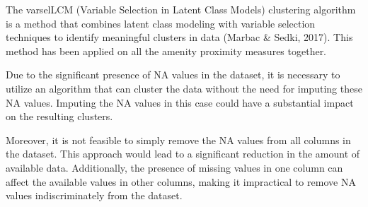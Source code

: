 \documentclass[11pt, a4paper]{article}
\begin{document}
The varselLCM (Variable Selection in Latent Class Models) clustering algorithm is a method that combines latent class modeling with variable selection techniques to identify meaningful clusters in data (Marbac \& Sedki, 2017). This method has been applied on all the amenity proximity measures together.
\par
Due to the significant presence of NA values in the dataset, it is necessary to utilize an algorithm that can cluster the data without the need for imputing these NA values. Imputing the NA values in this case could have a substantial impact on the resulting clusters.
\par
Moreover, it is not feasible to simply remove the NA values from all columns in the dataset. This approach would lead to a significant reduction in the amount of available data. Additionally, the presence of missing values in one column can affect the available values in other columns, making it impractical to remove NA values indiscriminately from the dataset.
\par
\end{document}
